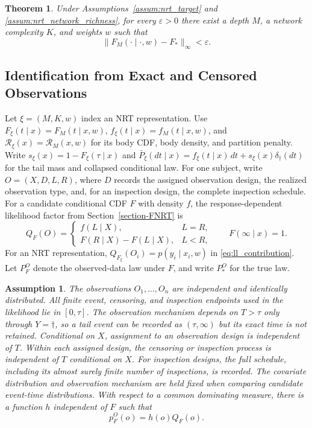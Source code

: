 \documentclass[11pt]{article}
\numberwithin{equation}{section}
\newtheorem{myTheo}{Theorem}
\newtheorem{assum}{Assumption}
\begin{document}
\begin{myTheo}
\label{thm:nrt_global_approximation}
Under Assumptions~\ref{assum:nrt_target} and \ref{assum:nrt_network_richness}, for every $\varepsilon>0$ there exist a depth $M$, a network complexity $K$, and weights $w$ such that
\begin{equation}
    \|F_M(\cdot\mid\cdot,w)-F_*\|_\infty<\varepsilon.
    \label{eq:nrt-uniform-cdf-approximation}
\end{equation}
\end{myTheo}

\subsection{Identification from Exact and Censored Observations}
\label{subsec:identification-consistency}

Let $\xi=(M,K,w)$ index an NRT representation. Use $F_\xi(t\mid x)=F_M(t\mid x,w)$, $f_\xi(t\mid x)=f_M(t\mid x,w)$, and $\mathcal R_\xi(x)=\mathcal R_M(x,w)$ for its body CDF, body density, and partition penalty. Write $s_\xi(x)=1-F_\xi(\tau\mid x)$ and $\bar P_\xi(dt\mid x)=f_\xi(t\mid x)\,dt+s_\xi(x)\delta_\dagger(dt)$ for the tail mass and collapsed conditional law. For one subject, write $O=(X,D,L,R)$, where $D$ records the assigned observation design, the realized observation type, and, for an inspection design, the complete inspection schedule. For a candidate conditional CDF $F$ with density $f$, the response-dependent likelihood factor from Section~\ref{section-FNRT} is
\begin{equation}
    Q_F(O)=
    \begin{cases}
        f(L\mid X), & L=R,\\
        F(R\mid X)-F(L\mid X), & L<R,
    \end{cases}
    \qquad F(\infty\mid x)=1.
    \label{eq:observed-likelihood-factor}
\end{equation}
For an NRT representation, $Q_{F_\xi}(O_i)=p(y_i\mid x_i,w)$ in \eqref{eq:ll_contribution}. Let $P_F^O$ denote the observed-data law under $F$, and write $P_*^O$ for the true law.

\begin{assum}
\label{assum:observation_scheme}
The observations $O_1,\ldots,O_n$ are independent and identically distributed. All finite event, censoring, and inspection endpoints used in the likelihood lie in $[0,\tau]$. The observation mechanism depends on $T>\tau$ only through $Y=\dagger$, so a tail event can be recorded as $(\tau,\infty)$ but its exact time is not retained. Conditional on $X$, assignment to an observation design is independent of $T$. Within each assigned design, the censoring or inspection process is independent of $T$ conditional on $X$. For inspection designs, the full schedule, including its almost surely finite number of inspections, is recorded. The covariate distribution and observation mechanism are held fixed when comparing candidate event-time distributions. With respect to a common dominating measure, there is a function $h$ independent of $F$ such that
\[
    p_F^O(o)=h(o)Q_F(o).
\]
\end{assum}
\end{document}
